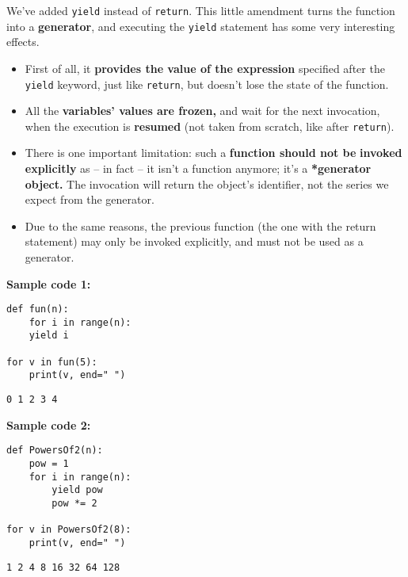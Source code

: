\documentclass[11pt]{article}
\begin{document}
We’ve added \texttt{yield} instead of \texttt{return}. This little amendment turns
the function into a \textbf{generator}, and executing the \texttt{yield} statement has
some very interesting effects.

\begin{itemize}
\item First of all, it \textbf{provides the value of the expression} specified
after the \texttt{yield} keyword, just like \texttt{return}, but doesn’t lose the
state of the function.
\item All the \textbf{variables’ values are frozen,} and wait for the next
invocation, when the execution is \textbf{resumed} (not taken from scratch,
like after \texttt{return}).
\item There is one important limitation: such a \textbf{function should not be}
\textbf{invoked explicitly} as – in fact – it isn’t a function anymore;
it’s a \textbf{*generator object.} The invocation will return the object’s 
identifier, not the series we expect from the generator.
\item Due to the same reasons, the previous function (the one with the
return statement) may only be invoked explicitly, and must not be
used as a generator.
\end{itemize}

\vspace{10 mm}

\textbf{Sample code 1:} 
\begin{verbatim}
def fun(n):
    for i in range(n):
	yield i

for v in fun(5):
    print(v, end=" ")
\end{verbatim}

\begin{verbatim}
0 1 2 3 4 
\end{verbatim}


\vspace{10 mm}

\textbf{Sample code 2:} 
\begin{verbatim}
def PowersOf2(n):
	pow = 1
	for i in range(n):
		yield pow
		pow *= 2

for v in PowersOf2(8):
	print(v, end=" ")
\end{verbatim}

\begin{verbatim}
1 2 4 8 16 32 64 128 
\end{verbatim}

\vspace{12 mm}
\end{document}
